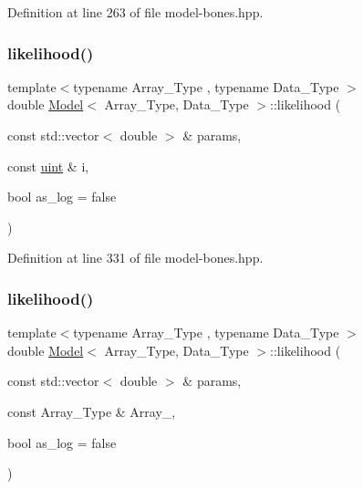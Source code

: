 Definition at line 263 of file model-\/bones.\+hpp.

\mbox{\label{class_model_abc2f255c6b6c4dd0ff3680aab35fd308}} 
\subsubsection{\texorpdfstring{likelihood()}{likelihood()}\hspace{0.1cm}{\footnotesize\ttfamily [1/2]}}
{\footnotesize\ttfamily template$<$typename Array\+\_\+\+Type , typename Data\+\_\+\+Type $>$ \\
double \hyperlink{class_model}{Model}$<$ Array\+\_\+\+Type, Data\+\_\+\+Type $>$\+::likelihood (\begin{DoxyParamCaption}\item[{const std\+::vector$<$ double $>$ \&}]{params,  }\item[{const \hyperlink{typedefs_8hpp_a91ad9478d81a7aaf2593e8d9c3d06a14}{uint} \&}]{i,  }\item[{bool}]{as\+\_\+log = {\ttfamily false} }\end{DoxyParamCaption})\hspace{0.3cm}{\ttfamily [inline]}}



Definition at line 331 of file model-\/bones.\+hpp.

\mbox{\label{class_model_adf2c30d9c5ffdc87af6813d110146968}} 
\subsubsection{\texorpdfstring{likelihood()}{likelihood()}\hspace{0.1cm}{\footnotesize\ttfamily [2/2]}}
{\footnotesize\ttfamily template$<$typename Array\+\_\+\+Type , typename Data\+\_\+\+Type $>$ \\
double \hyperlink{class_model}{Model}$<$ Array\+\_\+\+Type, Data\+\_\+\+Type $>$\+::likelihood (\begin{DoxyParamCaption}\item[{const std\+::vector$<$ double $>$ \&}]{params,  }\item[{const Array\+\_\+\+Type \&}]{Array\+\_\+,  }\item[{bool}]{as\+\_\+log = {\ttfamily false} }\end{DoxyParamCaption})\hspace{0.3cm}{\ttfamily [inline]}}




